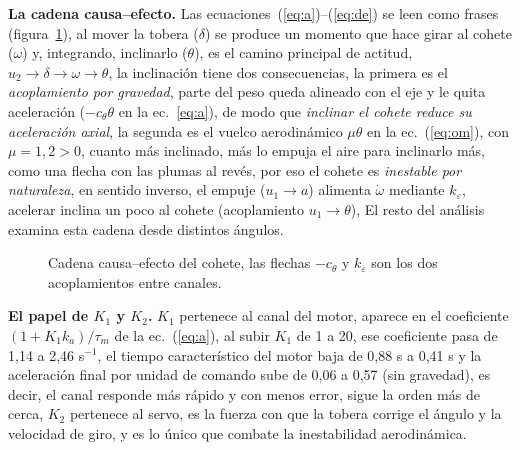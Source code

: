 \documentclass[article, 11pt]{IEEEtran}   %
\begin{document}
\textbf{La cadena causa--efecto.} Las ecuaciones~(\ref{eq:a})--(\ref{eq:de}) se leen como frases (figura~\ref{fig:cadena}), al mover la tobera ($\delta$) se produce un momento que hace girar al cohete ($\omega$) y, integrando, inclinarlo ($\theta$), es el camino principal de actitud, $u_2\to\delta\to\omega\to\theta$, la inclinaci\'on tiene dos consecuencias, la primera es el \emph{acoplamiento por gravedad}, parte del peso queda alineado con el eje y le quita aceleraci\'on ($-c_\theta\theta$ en la ec.~\ref{eq:a}), de modo que \emph{inclinar el cohete reduce su aceleraci\'on axial}, la segunda es el vuelco aerodin\'amico $\mu\theta$ en la ec.~(\ref{eq:om}), con $\mu=1{,}2>0$, cuanto m\'as inclinado, m\'as lo empuja el aire para inclinarlo m\'as, como una flecha con las plumas al rev\'es, por eso el cohete es \emph{inestable por naturaleza}, en sentido inverso, el empuje ($u_1\to a$) alimenta $\dot\omega$ mediante $k_\varepsilon$, acelerar inclina un poco al cohete (acoplamiento $u_1\to\theta$), El resto del an\'alisis examina esta cadena desde distintos \'angulos.

\begin{figure}[!t]
\centering
{}
\caption{Cadena causa--efecto del cohete, las flechas $-c_\theta$ y $k_\varepsilon$ son los dos acoplamientos entre canales.}\label{fig:cadena}
\end{figure}

\textbf{El papel de $K_1$ y $K_2$.} $K_1$ pertenece al canal del motor, aparece en el coeficiente $(1+K_1k_a)/\tau_m$ de la ec.~(\ref{eq:a}), al subir $K_1$ de 1 a 20, ese coeficiente pasa de 1,14 a 2,46 s$^{-1}$, el tiempo caracter\'istico del motor baja de 0,88 s a 0,41 s y la aceleraci\'on final por unidad de comando sube de 0,06 a 0,57 (sin gravedad), es decir, el canal responde m\'as r\'apido y con menos error, sigue la orden m\'as de cerca, $K_2$ pertenece al servo, es la fuerza con que la tobera corrige el \'angulo y la velocidad de giro, y es lo \'unico que combate la inestabilidad aerodin\'amica.
\end{document}
